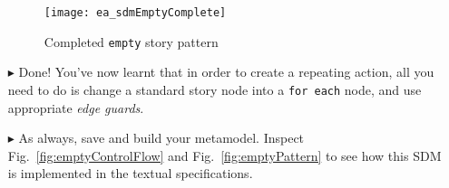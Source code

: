 \begin{itemize}
\begin{figure}[htbp]
\begin{center}
  \texttt{[image: ea\_sdmEmptyComplete]}
  \caption{Completed \texttt{empty} story pattern}  
  \label{fig:sdm_end}
\end{center}
\end{figure}
\FloatBarrier

\item[$\blacktriangleright$] Done! You've now learnt that in order to create a repeating action, all you need to do is change a standard story node
into a \texttt{for each} node, and use appropriate \emph{edge guards}. 

\item[$\blacktriangleright$] As always, save and build your metamodel. Inspect Fig.~\ref{fig:emptyControlFlow} and Fig.~\ref{fig:emptyPattern} to see how this
SDM is implemented in the textual specifications.


\end{itemize}

